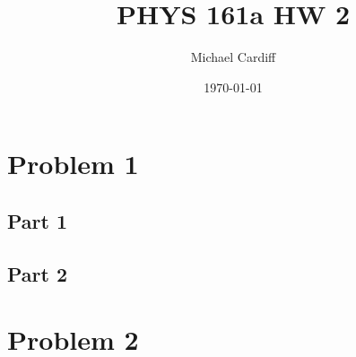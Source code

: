 \documentclass[12pt]{article}
\title{\vspace{-3em}PHYS 161a HW 2}
\author{Michael Cardiff}
\date{\today}
\begin{document}
\maketitle

\section*{Problem 1}
\subsection*{Part 1}

\subsection*{Part 2}

\section*{Problem 2}
\end{document}
